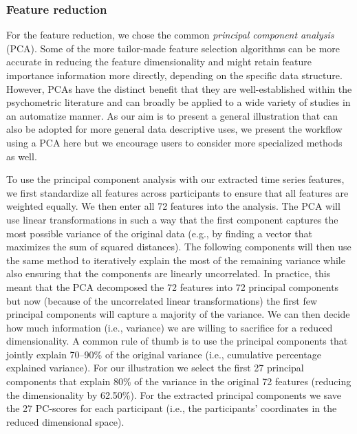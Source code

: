 \subsubsection{Feature reduction}

For the feature reduction, we chose the common
\textit{principal component analysis} (PCA). Some of the more
tailor-made feature selection algorithms can be more accurate in
reducing the feature dimensionality and might retain feature importance
information more directly, depending on the specific data structure.
However, PCAs have the distinct benefit that they are well-established
within the psychometric literature and can broadly be applied to a wide
variety of studies in an automatize manner. As our aim is to present a
general illustration that can also be adopted for more general data
descriptive uses, we present the workflow using a PCA here but we
encourage users to consider more specialized methods as well.

To use the principal component analysis with our extracted time series
features, we first standardize all features across participants to
ensure that all features are weighted equally. We then enter all 72
features into the analysis. The PCA will use linear transformations in
such a way that the first component captures the most possible variance
of the original data (e.g., by finding a vector that maximizes the sum
of squared distances). The following components will then use the same
method to iteratively explain the most of the remaining variance while
also ensuring that the components are linearly uncorrelated. In
practice, this meant that the PCA decomposed the 72 features into 72
principal components but now (because of the uncorrelated linear
transformations) the first few principal components will capture a
majority of the variance. We can then decide how much information (i.e.,
variance) we are willing to sacrifice for a reduced dimensionality. A
common rule of thumb is to use the principal components that jointly
explain 70--90\% of the original variance (i.e., cumulative percentage
explained variance). For our illustration we select the first 27
principal components that explain 80\% of the variance in the original
72 features (reducing the dimensionality by 62.50\%). For the extracted
principal components we save the 27 PC-scores for each participant
(i.e., the participants' coordinates in the reduced dimensional space).

